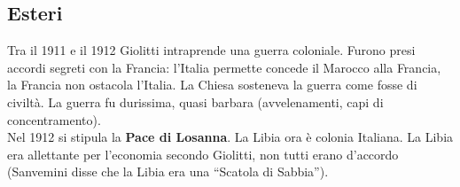 \subsection{Esteri}
Tra il 1911 e il 1912 Giolitti intraprende una guerra coloniale. Furono presi accordi segreti con la 
Francia: l'Italia permette concede il Marocco alla Francia, la Francia non ostacola l'Italia. La
Chiesa sosteneva la guerra come fosse di civiltà. La guerra fu durissima, quasi barbara 
(avvelenamenti, capi di concentramento).\\
Nel 1912 si stipula la \textbf{Pace di Losanna}. La Libia ora è colonia Italiana. La Libia era 
allettante per l'economia secondo Giolitti, non tutti erano d'accordo (Sanvemini disse che la Libia
era una ``Scatola di Sabbia'').
